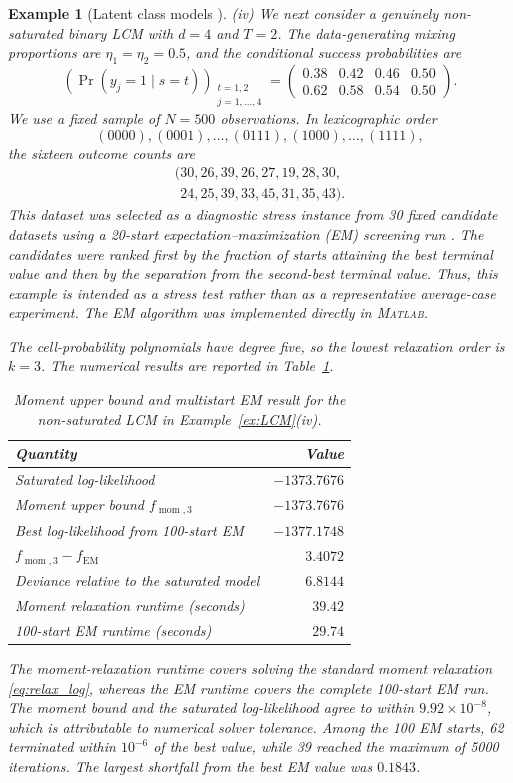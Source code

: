 \documentclass[pdflatex,sn-mathphys-num]{sn-jnl}%
\theoremstyle{thmstyleone}%
\theoremstyle{thmstyletwo}%
\newtheorem{example}{Example}%
\theoremstyle{thmstylethree}%
\begin{document}
\begin{example}[Latent class models \cite{ChenLCM20}]
{\noindent
(iv) We next consider a genuinely non-saturated binary LCM with
$d=4$ and $T=2$. The data-generating mixing proportions are
$\eta_1=\eta_2=0.5$, and the conditional success probabilities are
\[
\left(\Pr(y_j=1\mid s=t)\right)_{\substack{t=1,2\\j=1,\ldots,4}}
=
\begin{pmatrix}
0.38 & 0.42 & 0.46 & 0.50\\
0.62 & 0.58 & 0.54 & 0.50
\end{pmatrix}.
\]
We use a fixed sample of $N=500$ observations. In lexicographic order
\[
(0000),(0001),\ldots,(0111),(1000),\ldots,(1111),
\]
the sixteen outcome counts are
\[
\begin{array}{c}
(30,26,39,26,27,19,28,30,\\
\phantom{(}24,25,39,33,45,31,35,43).
\end{array}
\]
This dataset was selected as a diagnostic stress instance from
30 fixed candidate datasets using a 20-start expectation--maximization
(EM) screening run \cite{Dempster1977,EMBook}. The candidates
were ranked first by the
fraction of starts attaining the best terminal value and then by the
separation from the second-best terminal value. Thus, this example is
intended as a stress test rather than as a representative average-case
experiment.
The EM algorithm was implemented directly in \textsc{Matlab}.

The cell-probability polynomials have degree five, so the lowest
relaxation order is $k=3$. The numerical results are reported
in Table~\ref{tab:lcm_nonsaturated}.
\begin{table}[htb]
\centering
\caption{Moment upper bound and multistart EM result for the
non-saturated LCM in Example~\ref{ex:LCM}(iv).}
\label{tab:lcm_nonsaturated}
\begin{tabular}{|l|r|}
\hline
Quantity & Value\\
\hline
Saturated log-likelihood
    & $-1373.7676$\\
Moment upper bound $f_{\operatorname{mom},3}$
    & $-1373.7676$\\
Best log-likelihood from 100-start EM
    & $-1377.1748$\\
$f_{\operatorname{mom},3}-f_{\operatorname{EM}}$
    & $3.4072$\\
Deviance relative to the saturated model
    & $6.8144$\\
Moment relaxation runtime (seconds)
    & $39.42$\\
100-start EM runtime (seconds)
    & $29.74$\\
\hline
\end{tabular}
\end{table}
The moment-relaxation runtime covers solving the standard moment
relaxation \eqref{eq:relax_log}, whereas the EM runtime covers the
complete 100-start EM run.
The moment bound and the saturated log-likelihood agree to within
$9.92\times 10^{-8}$, which is attributable to numerical solver
tolerance. Among the 100 EM starts,
62 terminated within $10^{-6}$ of the best value, while 39 reached
the maximum of 5000 iterations. The largest shortfall from the best
EM value was $0.1843$.

}
\end{example}
\end{document}
